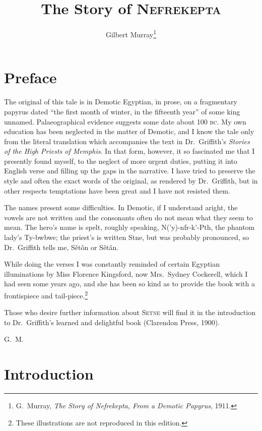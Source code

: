 \documentclass[12pt]{article}
\title{The Story of \textsc{Nefrekepta}}
\author{Gilbert Murray\footnote{G.~Murray, \textit{The Story of Nefrekepta,
From a Demotic Papyrus}, 1911.}}
\date{}
\begin{document}
\maketitle


\section*{Preface}

The original of this tale is in Demotic Egyptian, in prose, on a fragmentary
papyrus dated ``the first month of winter, in the fifteenth year'' of some king
unnamed. Palaeographical evidence suggests some date about 100 \textsc{bc}. My
own education has been neglected in the matter of Demotic, and I know the tale
only from the literal translation which accompanies the text in Dr.~Griffith's
\textit{Stories of the High Priests of Memphis}. In that form, however, it so
fascinated me that I presently found myself, to the neglect of more urgent
duties, putting it into English verse and filling up the gaps in the narrative.
I have tried to preserve the style and often the exact words of the original,
as rendered by Dr.~Griffith, but in other respects temptations have been great
and I have not resisted them.

The names present some difficulties. In Demotic, if I understand aright, the
vowels are not written and the consonants often do not mean what they seem to
mean. The hero's name is spelt, roughly speaking, N('y)-nfr-k'-Pth, the phantom
lady's Ty-bwbwe; the priest's is written Stne, but was probably pronounced, so
Dr.~Griffith tells me, S\v{e}t\^{o}n or S\v{e}t\^{a}n.

While doing the verses I was constantly reminded of certain Egyptian
illuminations by Miss Florence Kingsford, now Mrs.~Sydney Cockerell, which I
had seen some years ago, and she has been so kind as to provide the book with a
frontispiece and tail-piece.\footnote{These illustrations are not reproduced in
this edition.}

Those who desire further information about \textsc{Setne} will find it in the
introduction to Dr.~Griffith's learned and delightful book (Clarendon Press,
1900).

\null\hfill G.~M.


\section*{Introduction}
\end{document}
